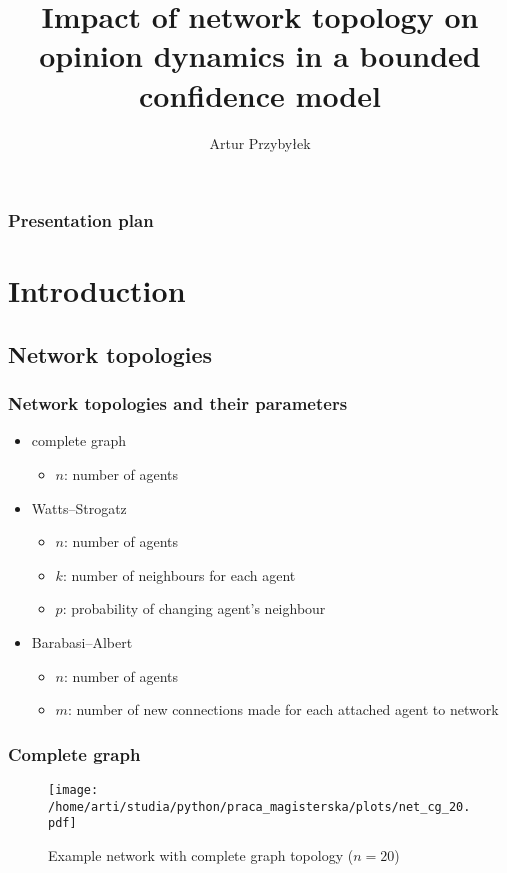 \documentclass[a4paper, 11pt]{beamer}
\begin{document}

\title{Impact of network topology on opinion dynamics in a bounded confidence model}
\author{Artur Przybyłek}
%
\begin{frame}%
\titlepage
\end{frame}
%
\begin{frame}
\frametitle{Presentation plan}
\tableofcontents
\end{frame}

\section{Introduction}

\subsection{Network topologies}

\begin{frame}
\frametitle{Network topologies and their parameters}
\begin{itemize}

	\item complete graph
	\begin{itemize}
		\item $n$: number of agents
	\end{itemize}

	\item Watts--Strogatz
	\begin{itemize}
		\item $n$: number of agents
		\item $k$: number of neighbours for each agent
		\item $p$: probability of changing agent's neighbour
	\end{itemize}
	
		\item Barabasi--Albert
	\begin{itemize}
		\item $n$: number of agents
		\item $m$: number of new connections made for each attached agent to network
	\end{itemize}
	
\end{itemize}
\end{frame}

\begin{frame}
\frametitle{Complete graph}
\begin{figure}[H]
		\centering
		\texttt{[image: /home/arti/studia/python/praca\_magisterska/plots/net\_cg\_20.pdf]}
		\caption{Example network with complete graph topology ($n=20$)}
\end{figure}
\end{frame}
\end{document}
